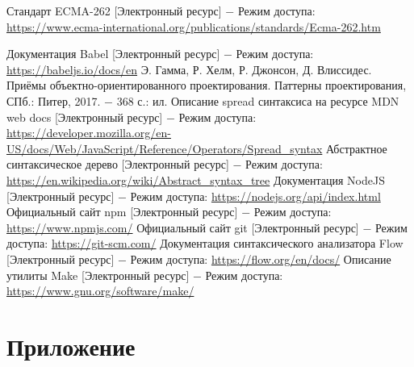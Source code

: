 \documentclass[14pt, a4paper]{article}
\begin{document}
\pagebreak

\begin{thebibliography}{9}
   Стандарт ECMA-262 [Электронный ресурс] $-$ Режим доступа: \linebreak
  \url{https://www.ecma-international.org/publications/standards/Ecma-262.htm}
  
   Документация Babel [Электронный ресурс] $-$ Режим доступа: \linebreak
  \url{https://babeljs.io/docs/en}
   Э. Гамма, Р. Хелм, Р. Джонсон, Д. Влиссидес. Приёмы объектно-ориентированного проектирования. Паттерны проектирования, СПб.: Питер, 2017. $-$ 368 с.: ил.
   Описание spread синтаксиса на ресурсе MDN web docs [Электронный ресурс] $-$ Режим доступа:
  \url{https://developer.mozilla.org/en-US/docs/Web/JavaScript/Reference/Operators/Spread_syntax}
   Абстрактное синтаксическое дерево [Электронный ресурс] $-$ Режим доступа: \url{https://en.wikipedia.org/wiki/Abstract_syntax_tree}
   Документация NodeJS [Электронный ресурс] $-$ Режим доступа: \linebreak \url{https://nodejs.org/api/index.html}
   Официальный сайт npm [Электронный ресурс] $-$ Режим доступа: \linebreak \url{https://www.npmjs.com/}
   Официальный сайт git [Электронный ресурс] $-$ Режим доступа: \linebreak \url{https://git-scm.com/}
   Документация синтаксического анализатора Flow [Электронный ресурс] $-$ Режим доступа: \url{https://flow.org/en/docs/}
   Описание утилиты Make [Электронный ресурс] $-$ Режим доступа: \linebreak \url{https://www.gnu.org/software/make/}
\end{thebibliography} 

\pagebreak
{}
\section*{Приложение}

\end{document}

